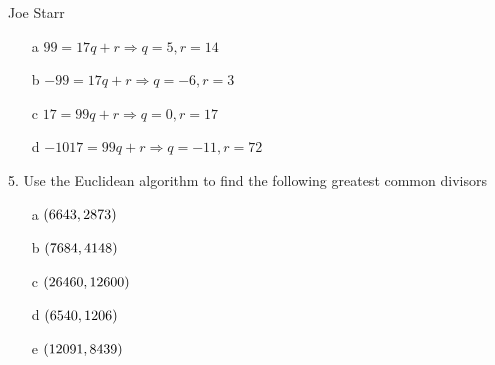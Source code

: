 \begin{mdframed}[style=darkAnswer]
Joe Starr\\
\begin{itemize}
    \item [a] {$99=17q+r\Rightarrow q=5, r=14$}
    \item [b] {$-99=17q+r\Rightarrow q=-6, r=3$}
    \item [c] {$17=99q+r\Rightarrow q=0, r=17$}
    \item [d] {$-1017=99q+r\Rightarrow q=-11, r=72$}
\end{itemize}
\end{mdframed}

\newpage
\begin{mdframed}[style=darkQuesion]
5.    Use the Euclidean algorithm to find the following greatest common divisors
\begin{itemize}
    \item [a] {$\left(6643,2873\right)$}
    \item [b] {$\left(7684,4148\right)$}
    \item [c] {$\left(26460,12600\right)$}
    \item [d] {$\left(6540,1206\right)$}
    \item [e] {$\left(12091,8439\right)$}
\end{itemize}

\end{mdframed}

